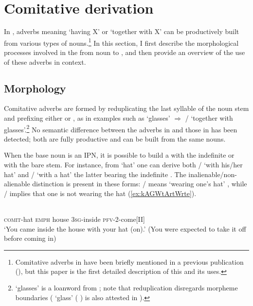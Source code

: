 \documentclass[output=paper]{langsci/langscibook}
\begin{document}
 
 \section{Comitative derivation} 
In , adverbs meaning `having X' or `together with X' can be productively built from various types of nouns.\footnote{Comitative adverbs in  have been briefly mentioned in a previous publication (\citealt[51]{jacques08}), but this paper is the first detailed description of this  and its uses.} In this section, I first describe the morphological processes involved in the  from noun to , and then provide an overview of the use of these adverbs in context.

\subsection{Morphology}
Comitative adverbs are formed by reduplicating the last syllable of the noun stem and prefixing either  or , as in examples such as  `glasses' $\Rightarrow$  /  `together with glasses'.\footnote{  `glasses' is a loanword from  ; note that reduplication disregards morpheme boundaries ( `glass' ( ) is also attested in ). } No semantic difference between the  adverbs in  and those in  has been detected; both are fully productive and can be built from the same nouns.

When the base noun is an IPN, it is possible to build a  with the indefinite  or with the bare stem. For instance, from  `hat' one can derive both  /  `with his/her hat' and  /   `with a hat' the latter bearing the indefinite  . The inalienable/non-alienable distinction is present in these forms:  /  means `wearing one's hat'  , while  /   implies that one is not wearing the hat (\ref{ex:kAGWtArtWrte}).



\begin{exe}
\ex \label{ex:kAGWrtWrte}
\gll {} 	 	 	 	 	\\
\textsc{comit}-hat \textsc{emph} house \textsc{3sg}-inside \textsc{pfv}-\textsc{2}-come[II] \\
\glt `You came inside the house with your hat (on).' (You were expected to take it off before coming in)
\end{exe}
\end{document}
